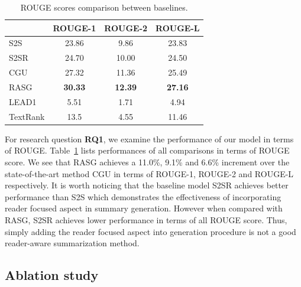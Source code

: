 \documentclass[letterpaper]{article}
\newcommand{\dubbelop}{$^{\blacktriangle}$}
\begin{document}
\newcommand{\cbkgrnd}{\cellcolor{blue!15}}
\newcommand{\phantomtriangle}{\phantom{\dubbelop}}
\begin{table}[t]
\centering
\small
\caption{ROUGE scores comparison between baselines.}
\begin{adjustbox}{width=0.31\columnwidth}
\begin{tabular}{@{}l ccc @{}}
\toprule
& ROUGE-1 & ROUGE-2 & ROUGE-L \\
\midrule
S2S &  23.86 & 9.86 & 23.83 \\
S2SR &  24.70 & 10.00 & 24.50 \\
CGU & 27.32 & 11.36 & 25.49  \\
RASG & \textbf{30.33} & \textbf{12.39} & \textbf{27.16} \\
\midrule
LEAD1 & 5.51 & 1.71 & 4.94 \\
TextRank & 13.5 & 4.55 & 11.46 \\
\bottomrule
\end{tabular}
\end{adjustbox}
\label{tab:comp_rouge_baselines}
\end{table}

For research question \textbf{RQ1}, we examine the performance of our model in terms of ROUGE.
Table~\ref{tab:comp_rouge_baselines} lists performances of all comparisons in terms of ROUGE score.
We see that RASG achieves a 11.0\%, 9.1\% and 6.6\% increment over the state-of-the-art method CGU in terms of ROUGE-1, ROUGE-2 and ROUGE-L respectively.
It is worth noticing that the baseline model S2SR achieves better performance than S2S which demonstrates the effectiveness of incorporating reader focused aspect in summary generation.
However when compared with RASG, S2SR achieves lower performance in terms of all ROUGE score.
Thus, simply adding the reader focused aspect into generation procedure is not a good reader-aware summarization method.

\subsection{Ablation study}
\end{document}
